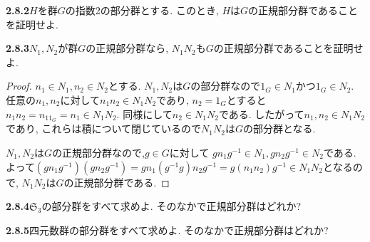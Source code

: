 \begin{enumerate}[label=(\arabic*)\;]
\end{enumerate}

\textbf{2.8.2}\quad $H$を群$G$の指数2の部分群とする. 
このとき, $H$は$G$の正規部分群であることを証明せよ.

\textbf{2.8.3}\quad $N_1, N_2$が群$G$の正規部分群なら, 
$N_1 N_2$も$G$の正規部分群であることを証明せよ.

\begin{proof}
	$n_1 \in N_1, n_2 \in N_2$とする.
	$N_1, N_2$は$G$の部分群なので$1_G\in N_1$かつ$1_G \in N_2$.
	任意の$n_1, n_2$に対して$n_1n_2 \in N_1N_2$であり,
	$n_2=1_G$とすると$n_1n_2=n_11_G=n_1 \in N_1N_2$.
	同様にして$n_2 \in N_1N_2$である.
	したがって$n_1, n_2 \in N_1N_2$であり, 
	これらは積について閉じているので$N_1N_2$は$G$の部分群となる.

	$N_1, N_2$は$G$の正規部分群なので,$g \in G$に対して
	$gn_1g^{-1} \in N_1, gn_2g^{-1} \in N_2$である.
	よって$(gn_1g^{-1})(gn_2g^{-1})=gn_1(g^{-1}g)n_2g^{-1}
	=g(n_1n_2)g^{-1} \in N_1N_2$となるので,
	$N_1N_2$は$G$の正規部分群である.
\end{proof}

\textbf{2.8.4}\quad $\mathfrak{S}_3$の部分群をすべて求めよ.
そのなかで正規部分群はどれか?

\textbf{2.8.5}\quad 四元数群の部分群をすべて求めよ.
そのなかで正規部分群はどれか?
